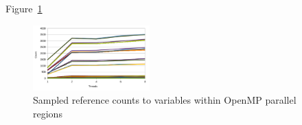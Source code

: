Figure~\ref{fig:openmp-refcount}

\begin{figure}
\begin{center}
\includegraphics[width=0.4\textwidth]{images/cp2k-omp-inc-full.pdf}
\end{center}
\caption{Sampled reference counts to variables within OpenMP parallel regions}
\label{fig:openmp-refcount}
\end{figure}
